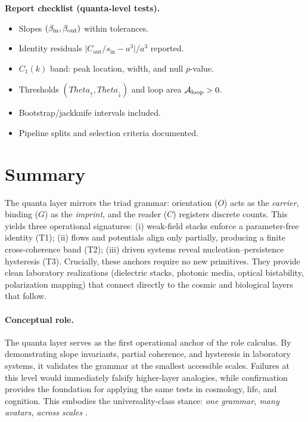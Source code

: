 \documentclass[12pt,a4paper,oneside]{scrreprt}
\def\Theta{Theta}%
\begin{document}
\begin{checklist}
\textbf{Report checklist (quanta-level tests).}
\begin{itemize}
  \item Slopes $(\beta_{\rm in}, \beta_{\rm out})$ within tolerances. 
  \item Identity residuals $\big| C_{\mathrm{out}}/s_{\mathrm{in}} - a^3 \big| / a^3$ reported.
  \item $C_1(k)$ band: peak location, width, and null $p$-value.
  \item Thresholds $(\Theta_\uparrow, \Theta_\downarrow)$ and loop area $\mathcal A_{\rm loop} > 0$.
  \item Bootstrap/jackknife intervals included.
  \item Pipeline splits and selection criteria documented.
\end{itemize}
\end{checklist}

\section*{Summary}

The quanta layer mirrors the triad grammar: orientation ($O$) acts as the 
\emph{carrier}, binding ($G$) as the \emph{imprint}, and the reader ($C$) 
registers discrete counts. 
This yields three operational signatures: 
(i) weak-field stacks enforce a parameter-free identity (T1); 
(ii) flows and potentials align only partially, producing a finite cross-coherence 
band (T2); 
(iii) driven systems reveal nucleation–persistence hysteresis (T3). 
Crucially, these anchors require no new primitives. 
They provide clean laboratory realizations (dielectric stacks, photonic media, 
optical bistability, polarization mapping) that connect directly to the 
cosmic and biological layers that follow. 

\paragraph{Conceptual role.} 
The quanta layer serves as the first operational anchor of the role calculus. 
By demonstrating slope invariants, partial coherence, and hysteresis in laboratory 
systems, it validates the grammar at the smallest accessible scales. 
Failures at this level would immediately falsify higher-layer analogies, 
while confirmation provides the foundation for applying the same tests in 
cosmology, life, and cognition. 
This embodies the universality-class stance: 
\emph{one grammar, many avatars, across scales} \citep{Stanley1971Phase,Eigen1971}.
\end{document}

